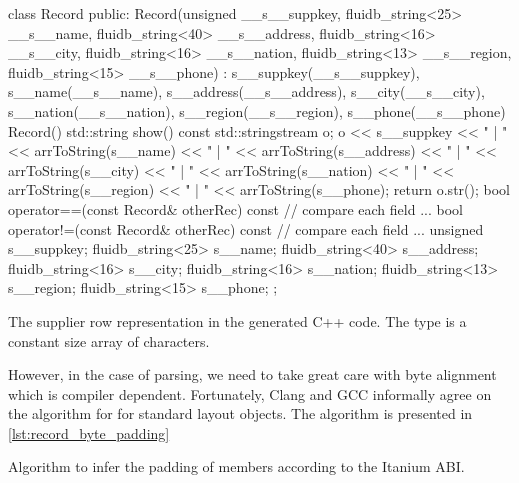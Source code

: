 \begin{code}
\begin{cppcode}
class Record {
public:
  Record(unsigned __s__suppkey, fluidb_string<25> __s__name,
         fluidb_string<40> __s__address, fluidb_string<16> __s__city,
         fluidb_string<16> __s__nation, fluidb_string<13> __s__region,
         fluidb_string<15> __s__phone)
    : s__suppkey(__s__suppkey),
      s__name(__s__name),
      s__address(__s__address),
      s__city(__s__city),
      s__nation(__s__nation),
      s__region(__s__region),
      s__phone(__s__phone) {}
  Record() {}
  std::string show() const {
    std::stringstream o;
    o << s__suppkey << " | " << arrToString(s__name) << " | "
      << arrToString(s__address) << " | " << arrToString(s__city) << " | "
      << arrToString(s__nation) << " | " << arrToString(s__region) << " | "
      << arrToString(s__phone);
    return o.str();
  }
  bool operator==(const Record& otherRec) const {
    // compare each field ...
  }
  bool operator!=(const Record& otherRec) const {
    // compare each field ...
  }
  unsigned s__suppkey;
  fluidb_string<25> s__name;
  fluidb_string<40> s__address;
  fluidb_string<16> s__city;
  fluidb_string<16> s__nation;
  fluidb_string<13> s__region;
  fluidb_string<15> s__phone;
};
\end{cppcode}
  \caption{\label{lst:record_class}The supplier row representation in
    the generated C++ code. The  type is a
    constant size array of characters.}
\end{code}

However, in the case of parsing, we need to take great care with byte
alignment which is compiler dependent. Fortunately, Clang and GCC
informally agree on the algorithm for  for
standard layout objects. The algorithm is presented in
\ref{lst:record_byte_padding}

\begin{code}
  \caption{\label{lst:record_byte_padding}Algorithm to infer the
    padding of members according to the Itanium ABI.}
\end{code}

